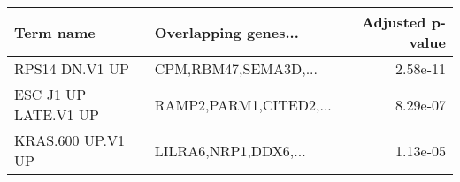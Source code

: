 \begin{tabular}{llr}
\toprule
           Term name &   Overlapping genes... &  Adjusted p-value \\
\midrule
      RPS14 DN.V1 UP &   CPM,RBM47,SEMA3D,... &          2.58e-11 \\
ESC J1 UP LATE.V1 UP & RAMP2,PARM1,CITED2,... &          8.29e-07 \\
   KRAS.600 UP.V1 UP &   LILRA6,NRP1,DDX6,... &          1.13e-05 \\
\bottomrule
\end{tabular}
